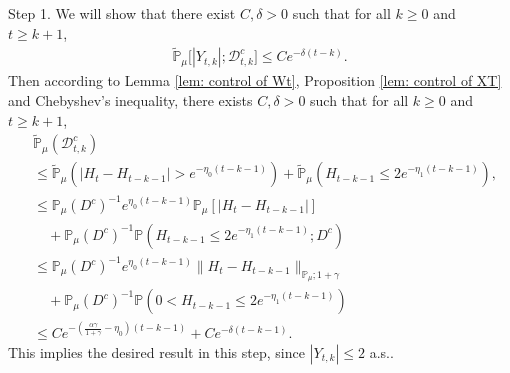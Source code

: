 \documentclass[12pt,a4paper]{amsart}
\theoremstyle{plain}
\theoremstyle{definition}
\numberwithin{equation}{section}
\begin{document}
    Step 1. We will show that there exist $C,\delta >0$ such that for all $k \geq 0$ and $t\geq k+1$,
\begin{equation}\begin{split}
\label{thm121}
    \mathbb{\tilde{P}}_{\mu}\big[|Y_{t,k}|;\mathcal{D}^c_{t,k}\big]
    \leq C e^{-\delta (t-k)}.
\end{split}\end{equation}
    Then according to Lemma \ref{lem: control of Wt}, Proposition \ref{lem: control of XT} and Chebyshev's inequality, there exists $C, \delta>0$ such that for all $k \geq 0$ and $t\geq k+1$,
\begin{equation}\begin{split}
\label{eq: prob of Dtkc}
    &\mathbb{\tilde{P}}_{\mu}(\mathcal{D}_{t,k}^c)
    \\&\leq \mathbb{\tilde{P}}_{\mu}(|H_t-H_{t-k-1}| > e^{-\eta_0 (t-k-1)})+\mathbb{\tilde{P}}_{\mu}(H_{t-k-1}\leq 2e^{-\eta_1(t-k-1)}),
    \\&\leq \mathbb{P}_{\mu}(D^c)^{-1}e^{\eta_0(t-k-1)}\mathbb{P}_{\mu}[|H_t-H_{t-k-1}|]
    \\&\quad +\mathbb{P}_{\mu}(D^c)^{-1} \mathbb P(H_{t-k-1}\leq 2e^{-\eta_1(t-k-1)}; D^c)
    \\&\leq \mathbb{P}_{\mu}(D^c)^{-1}  e^{\eta_0(t-k-1)}\|H_t - H_{t-k-1}\|_{\mathbb P_\mu; 1+\gamma}
    \\&\quad + \mathbb{P}_{\mu}(D^c)^{-1} \mathbb P(0<H_{t-k-1}\leq 2e^{-\eta_1(t-k-1)})
    \\&\leq C e^{-(\frac{\alpha \gamma}{1+\gamma} - \eta_0)(t-k-1)}+C e^{-\delta(t-k-1)}.
\end{split}\end{equation}
    This implies the desired result in this step, since $|Y_{t,k}| \leq 2$ a.s..
\end{document}
